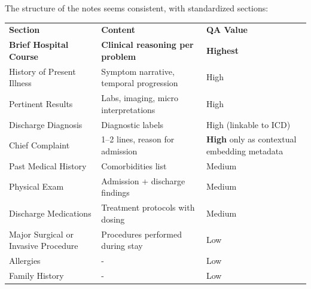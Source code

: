 \documentclass[11pt,a4paper]{article}
\newcommand{\blueText}[1]{\textcolor{betterblue}{#1}}
\newcommand{\mr}{\specialrule{0.4pt}{4pt}{4pt}}
\newcommand{\tr}{\specialrule{0.8pt}{4pt}{6pt}}
\begin{document}
The structure of the notes seems consistent, with standardized sections:

\bigskip
\begin{center}
	\small
	\begin{tabular}{p{4cm} p{6.5cm}p{3.8cm}}
		\textbf{Section}                          & \textbf{Content}                                   & \textbf{QA Value}                                   \\
		\tr
		\blueText{\textbf{Brief Hospital Course}} & \blueText{\textbf{Clinical reasoning per problem}} & \blueText{\textbf{Highest}}                         \\
		History of Present Illness                & Symptom narrative, temporal progression            & High                                                \\
		Pertinent Results                         & Labs, imaging, micro interpretations               & High                                                \\
		Discharge Diagnosis                       & Diagnostic labels                                  & High (linkable to ICD)                              \\
		\mr
		Chief Complaint                           & 1--2 lines, reason for admission                   & \textbf{High} only as contextual embedding metadata \\
		Past Medical History                      & Comorbidities list                                 & Medium                                              \\
		Physical Exam                             & Admission + discharge findings                     & Medium                                              \\
		Discharge Medications                     & Treatment protocols with dosing                    & Medium                                              \\
		\mr
		Major Surgical or Invasive Procedure      & Procedures performed during stay                   & Low                                                 \\
		Allergies                                 & -                                                  & Low                                                 \\
		Family History                            & -                                                  & Low                                                 \\

\end{tabular}
\end{center}
\end{document}
